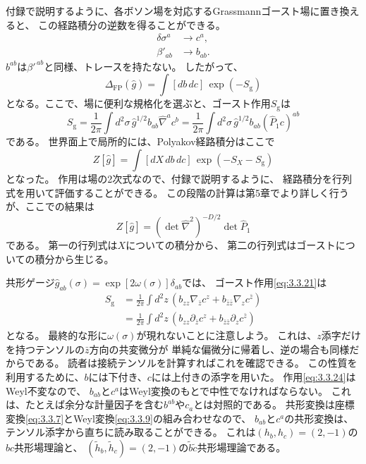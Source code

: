 付録で説明するように、各ボソン場を対応するGrassmannゴースト場に置き換えると、
この経路積分の逆数を得ることができる。
\begin{align}
\delta\sigma^a&\longrightarrow c^a,
\tag{3.3.19a}\label{eq:3.3.19a}\\
\beta'_{ab}&\longrightarrow b_{ab}.
\tag{3.3.19b}\label{eq:3.3.19b}
\end{align}
$b^{ab}$は$\beta'^{\,ab}$と同様、トレースを持たない。
したがって、
\begin{equation}
\Delta_{\mathrm{FP}}(\hat g)=\int[db\,dc]\,\exp(-S_{\mathrm g})
\tag{3.3.20}\label{eq:3.3.20}
\end{equation}
となる。ここで、場に便利な規格化を選ぶと、ゴースト作用$S_{\mathrm g}$は
\begin{equation}
S_{\mathrm g}
=\frac{1}{2\pi}\int d^2\sigma\,\hat g^{1/2}b_{ab}\hat\nabla^{a}c^{b}
=\frac{1}{2\pi}\int d^2\sigma\,\hat g^{1/2}b_{ab}(\hat P_1c)^{ab}
\tag{3.3.21}\label{eq:3.3.21}
\end{equation}
である。
世界面上で局所的には、Polyakov経路積分はここで
\begin{equation}
Z[\hat g]=\int[dX\,db\,dc]\,\exp(-S_X-S_{\mathrm g})
\tag{3.3.22}\label{eq:3.3.22}
\end{equation}
となった。
作用は場の2次式なので、付録で説明するように、
経路積分を行列式を用いて評価することができる。
この段階の計算は第5章でより詳しく行うが、ここでの結果は
\begin{equation}
Z[\hat g]=(\det\hat\nabla^2)^{-D/2}\det\hat P_1
\tag{3.3.23}\label{eq:3.3.23}
\end{equation}
である。
第一の行列式は$X$についての積分から、
第二の行列式はゴーストについての積分から生じる。

共形ゲージ$\hat g_{ab}(\sigma)=\exp[2\omega(\sigma)]\delta_{ab}$では、
ゴースト作用\eqref{eq:3.3.21}は
\begin{equation}
\begin{aligned}
S_{\mathrm g}
&=\frac{1}{2\pi}\int d^2z\,
  \left(b_{zz}\nabla_{\bar z}c^z+b_{\bar z\bar z}\nabla_zc^{\bar z}\right)\\
&=\frac{1}{2\pi}\int d^2z\,
  \left(b_{zz}\partial_{\bar z}c^z+b_{\bar z\bar z}\partial_zc^{\bar z}\right)
\end{aligned}
\tag{3.3.24}\label{eq:3.3.24}
\end{equation}
となる。
最終的な形に$\omega(\sigma)$が現れないことに注意しよう。
これは、$z$添字だけを持つテンソルの$\bar z$方向の共変微分が
単純な偏微分に帰着し、逆の場合も同様だからである。
読者は接続テンソルを計算すればこれを確認できる。
この性質を利用するために、$b$には下付き、$c$には上付きの添字を用いた。
作用\eqref{eq:3.3.24}はWeyl不変なので、
$b_{ab}$と$c^a$はWeyl変換のもとで中性でなければならない。
これは、たとえば余分な計量因子を含む$b^{ab}$や$c_a$とは対照的である。
共形変換は座標変換\eqref{eq:3.3.7}とWeyl変換\eqref{eq:3.3.9}の組み合わせなので、
$b_{ab}$と$c^a$の共形変換は、テンソル添字から直ちに読み取ることができる。
これは$(h_b,h_c)=(2,-1)$の$bc$共形場理論と、
$(\tilde h_b,\tilde h_c)=(2,-1)$の$\tilde b\tilde c$共形場理論である。

